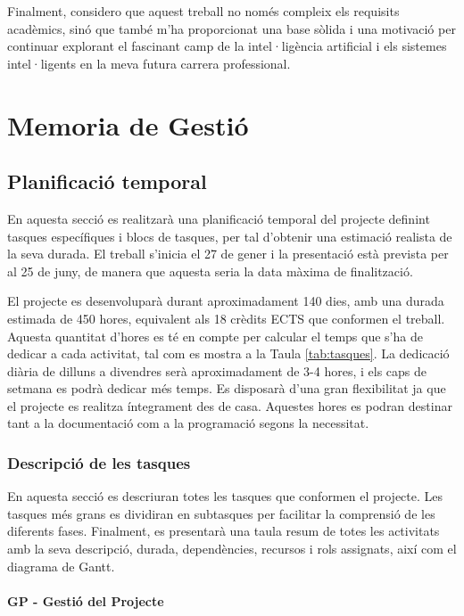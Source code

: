 \documentclass[a4paper,12pt]{report}
\begin{document}
Finalment, considero que aquest treball no només compleix els requisits acadèmics, sinó que també m'ha proporcionat una base sòlida i una motivació per continuar explorant el fascinant camp de la intel·ligència artificial i els sistemes intel·ligents en la meva futura carrera professional.

\part{Memoria de Gestió}

\chapter{Planificació temporal}

En aquesta secció es realitzarà una planificació temporal del projecte definint tasques específiques i blocs de tasques, per tal d'obtenir una estimació realista de la seva durada.
El treball s'inicia el 27 de gener i la presentació està prevista per al 25 de juny, de manera que aquesta seria la data màxima de finalització.

El projecte es desenvoluparà durant aproximadament 140 dies, amb una durada estimada de 450 hores, equivalent als 18 crèdits ECTS que conformen el treball.
Aquesta quantitat d'hores es té en compte per calcular el temps que s'ha de dedicar a cada activitat, tal com es mostra a la Taula \ref{tab:tasques}.
La dedicació diària de dilluns a divendres serà aproximadament de 3-4 hores, i els caps de setmana es podrà dedicar més temps.
Es disposarà d'una gran flexibilitat ja que el projecte es realitza íntegrament des de casa.
Aquestes hores es podran destinar tant a la documentació com a la programació segons la necessitat.

\section{Descripció de les tasques}

En aquesta secció es descriuran totes les tasques que conformen el projecte.
Les tasques més grans es dividiran en subtasques per facilitar la comprensió de les diferents fases.
Finalment, es presentarà una taula resum de totes les activitats amb la seva descripció, durada, dependències, recursos i rols assignats, així com el diagrama de Gantt.

\subsection{GP - Gestió del Projecte}
\end{document}
